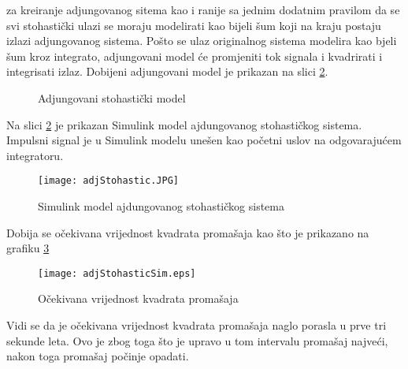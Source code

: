 za kreiranje adjungovanog sitema kao i ranije sa jednim dodatnim pravilom da se 
svi stohastički ulazi se moraju modelirati kao bijeli šum koji na kraju postaju 
izlazi adjungovanog sistema. Pošto se ulaz originalnog sistema modelira kao bjeli šum 
kroz integrato, adjungovani model će promjeniti tok signala i kvadrirati i integrisati izlaz.
Dobijeni adjungovani model je prikazan na slici \ref{fig:adjStohastic}.
\begin{figure}[h!]
    \centering

    \caption{Adjungovani stohastički model}
    \label{fig:adjStohastic}
\end{figure}
Na slici \ref{fig:adjStohastic} je prikazan Simulink model ajdungovanog stohastičkog sistema. 
Impulsni signal je u Simulink modelu unešen kao početni uslov na odgovarajućem integratoru. 
\begin{figure}[h!]
    \centering
    \texttt{[image: adjStohastic.JPG]}
    \caption{Simulink model ajdungovanog stohastičkog sistema}
    \label{fig:adjStohastic}
\end{figure}
Dobija se očekivana vrijednost kvadrata promašaja kao što je prikazano na grafiku \ref{fig:stohGraf}
\begin{figure}[h!]
    \centering
    \texttt{[image: adjStohasticSim.eps]}
    \caption{Očekivana vrijednost kvadrata promašaja}
    \label{fig:stohGraf}
\end{figure}
Vidi se da je očekivana vrijednost kvadrata promašaja naglo porasla u prve tri sekunde leta. 
Ovo je zbog toga što je upravo u tom intervalu promašaj najveći, nakon toga promašaj počinje opadati.



